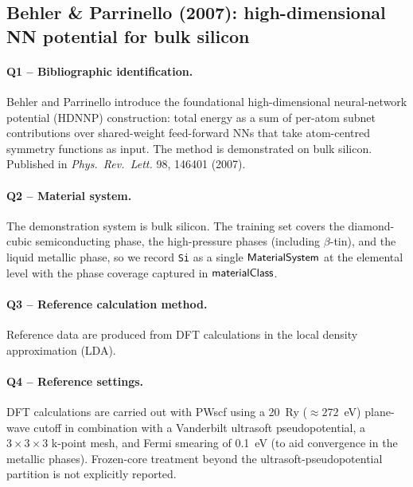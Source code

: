 \subsection{Behler \& Parrinello (2007): high-dimensional NN potential for bulk silicon}
\label{sec:appendix-example-behler2007}

\paragraph{Q1 -- Bibliographic identification.}
Behler and Parrinello introduce the foundational
high-dimensional neural-network potential (HDNNP) construction:
total energy as a sum of per-atom subnet contributions over
shared-weight feed-forward NNs that take atom-centred symmetry
functions as input. The method is demonstrated on bulk silicon.
Published in \emph{Phys.\ Rev.\ Lett.} 98, 146401 (2007).


\paragraph{Q2 -- Material system.}
The demonstration system is bulk silicon. The training set covers
the diamond-cubic semiconducting phase, the high-pressure phases
(including $\beta$-tin), and the liquid metallic phase, so we
record \texttt{Si} as a single $\mathsf{MaterialSystem}$ at the
elemental level with the phase coverage captured in
$\mathsf{materialClass}$.


\paragraph{Q3 -- Reference calculation method.}
Reference data are produced from DFT calculations in the local
density approximation (LDA).


\paragraph{Q4 -- Reference settings.}
DFT calculations are carried out with PWscf using a 20~Ry
($\approx 272$~eV) plane-wave cutoff in combination with a
Vanderbilt ultrasoft pseudopotential, a $3 \times 3 \times 3$
k-point mesh, and Fermi smearing of 0.1~eV (to aid convergence in
the metallic phases). Frozen-core treatment beyond the
ultrasoft-pseudopotential partition is not explicitly reported.


